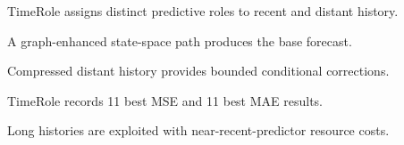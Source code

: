 \begin{highlights}
\item TimeRole assigns distinct predictive roles to recent and distant history.
\item A graph-enhanced state-space path produces the base forecast.
\item Compressed distant history provides bounded conditional corrections.
\item TimeRole records 11 best MSE and 11 best MAE results.
\item Long histories are exploited with near-recent-predictor resource costs.
\end{highlights}
